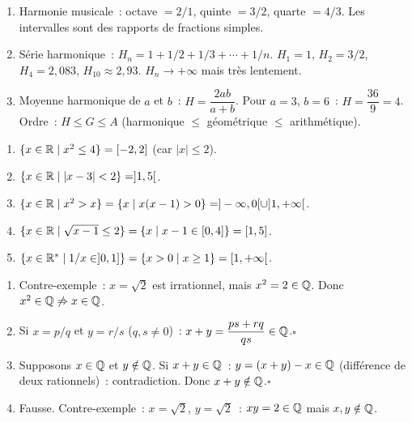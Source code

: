 
\begin{enumerate}
  \item Harmonie musicale~: octave $=2/1$, quinte $=3/2$, quarte $=4/3$.
        Les intervalles sont des rapports de fractions simples.
  \item S\'erie harmonique~: $H_n=1+1/2+1/3+\cdots+1/n$.
        $H_1=1$, $H_2=3/2$, $H_4=2{,}083$, $H_{10}\approx2{,}93$.
        $H_n\to+\infty$ mais tr\`es lentement.
  \item Moyenne harmonique de $a$ et $b$~: $H=\dfrac{2ab}{a+b}$.
        Pour $a=3$, $b=6$~: $H=\dfrac{36}{9}=4$.
        Ordre~: $H\leq G\leq A$ (harmonique $\leq$ g\'eom\'etrique $\leq$ arithm\'etique).
\end{enumerate}


\begin{enumerate}
  \item $\{x\in\mathbb{R}\mid x^2\leq4\}=[-2,2]$ (car $|x|\leq2$).
  \item $\{x\in\mathbb{R}\mid|x-3|<2\}=]1,5[$.
  \item $\{x\in\mathbb{R}\mid x^2>x\}=\{x\mid x(x-1)>0\}=]-\infty,0[\cup]1,+\infty[$.
  \item $\{x\in\mathbb{R}\mid\sqrt{x-1}\leq2\}=\{x\mid x-1\in[0,4]\}=[1,5]$.
  \item $\{x\in\mathbb{R}^*\mid1/x\in]0,1]\}=\{x>0\mid x\geq1\}=[1,+\infty[$.
\end{enumerate}


\begin{enumerate}
  \item Contre-exemple~: $x=\sqrt{2}$ est irrationnel, mais $x^2=2\in\mathbb{Q}$.
        Donc $x^2\in\mathbb{Q}\not\Rightarrow x\in\mathbb{Q}$.
  \item Si $x=p/q$ et $y=r/s$ ($q,s\ne0$)~:
        $x+y=\dfrac{ps+rq}{qs}\in\mathbb{Q}$.\hfill$\square$
  \item Supposons $x\in\mathbb{Q}$ et $y\notin\mathbb{Q}$.
        Si $x+y\in\mathbb{Q}$~: $y=(x+y)-x\in\mathbb{Q}$ (diff\'erence de deux rationnels)~:
        contradiction. Donc $x+y\notin\mathbb{Q}$.\hfill$\square$
  \item Fausse. Contre-exemple~: $x=\sqrt{2}$, $y=\sqrt{2}$~:
        $xy=2\in\mathbb{Q}$ mais $x,y\notin\mathbb{Q}$.
\end{enumerate}

